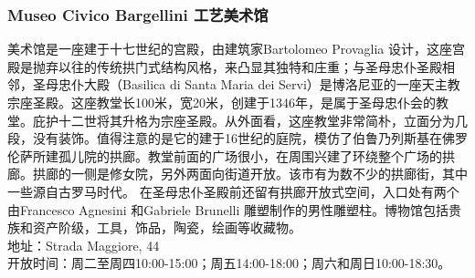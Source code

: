 \subsubsection{Museo Civico Bargellini  工艺美术馆}
美术馆是一座建于十七世纪的宫殿，由建筑家Bartolomeo Provaglia 设计，这座宫殿是抛弃以往的传统拱门式结构风格，来凸显其独特和庄重；与圣母忠仆圣殿相邻，圣母忠仆大殿（Basilica di Santa Maria dei Servi）是博洛尼亚的一座天主教宗座圣殿。这座教堂长100米，宽20米，创建于1346年，是属于圣母忠仆会的教堂。庇护十二世将其升格为宗座圣殿。从外面看，这座教堂非常简朴，立面分为几段，没有装饰。值得注意的是它的建于16世纪的庭院，模仿了伯鲁乃列斯基在佛罗伦萨所建孤儿院的拱廊。教堂前面的广场很小，在周围兴建了环绕整个广场的拱廊。拱廊的一侧是修女院，另外两面向街道开放。该市有为数不少的拱廊街，其中一些源自古罗马时代。
在圣母忠仆圣殿前还留有拱廊开放式空间，入口处有两个由Francesco Agnesini 和Gabriele Brunelli 雕塑制作的男性雕塑柱。博物馆包括贵族和资产阶级，工具，饰品，陶瓷，绘画等收藏物。\\
地址：Strada Maggiore, 44\\
开放时间：周二至周四10:00-15:00；周五14:00-18:00；周六和周日10:00-18:30。\\